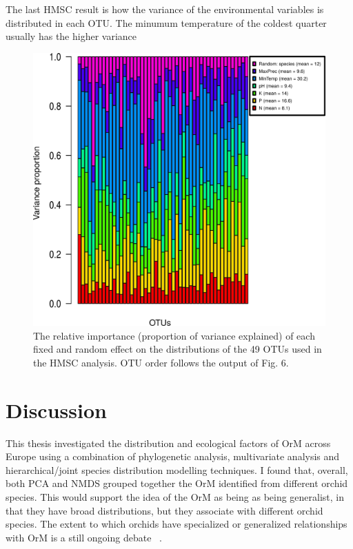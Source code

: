 The last HMSC result is how the variance of the environmental variables is distributed in each OTU. The minumum temperature of the coldest quarter usually has the higher variance

\begin{figure}[htbp]
\centering
\includegraphics[keepaspectratio,width=\textwidth,height=0.75\textheight]{images/varDistribution00.png}
\caption{The relative importance (proportion of variance explained) of each fixed and random effect on the distributions of the 49 OTUs used in the HMSC analysis. OTU order follows the output of Fig. 6.}
\end{figure}

\part{Discussion}
\label{discussion}

This thesis investigated the distribution and ecological factors of OrM across Europe using a combination of phylogenetic analysis, multivariate analysis and hierarchical\slash joint species distribution modelling techniques. I found that, overall, both PCA and NMDS grouped together the OrM identified from different orchid species. This would support the idea of the OrM as being as being generalist, in that they have broad distributions, but they associate with different orchid species. The extent to which orchids have specialized or generalized relationships with OrM is a still ongoing debate ~\citep{bailarote2012}.

